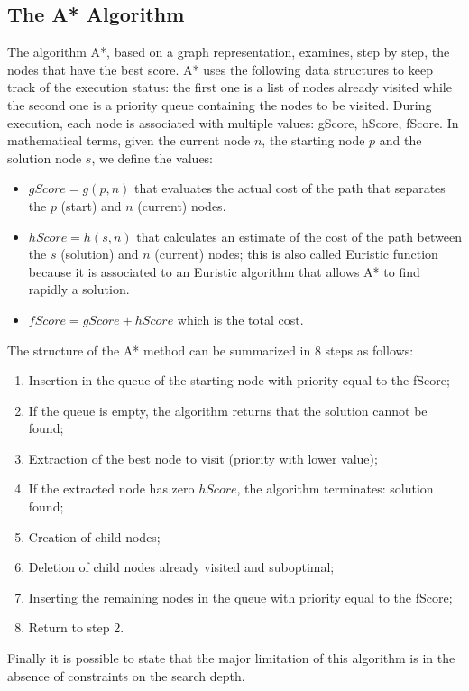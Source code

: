 \subsection{The A* Algorithm}
The algorithm A*, based on a graph representation, examines, step by step, the nodes that have the best score. A* uses the following data structures to keep track of the execution status: the first one is a list of nodes already visited while the second one is a priority queue containing the nodes to be visited. During execution, each node is associated with multiple values: gScore, hScore, fScore. In mathematical terms, given the current node $n$, the starting node $p$ and the solution node $s$, we define the values:
\begin{itemize}
	\item $gScore = g(p,n)$ that evaluates the actual cost of the path that separates the $p$ (start) and $n$ (current) nodes.
	\item $hScore = h(s,n)$ that calculates an estimate of the cost of the path between the $s$ (solution) and $n$ (current) nodes; this is also called Euristic function because it is associated to an Euristic algorithm that allows A* to find rapidly a solution.
	\item $fScore = gScore + hScore$ which is the total cost. 
\end{itemize}

The structure of the A* method can be summarized in 8 steps as follows:
\begin{enumerate}
	\item Insertion in the queue of the starting node with priority equal to the fScore;
	\item If the queue is empty, the algorithm returns that the solution cannot be found;
	\item Extraction of the best node to visit (priority with lower value);
	\item If the extracted node has zero $hScore$, the algorithm terminates: solution found;
	\item Creation of child nodes;
	\item Deletion of child nodes already visited and suboptimal;
	\item Inserting the remaining nodes in the queue with priority equal to the fScore;
	\item Return to step 2.
\end{enumerate}
Finally it is possible to state that the major limitation of this algorithm is in the absence of constraints on the search depth.
